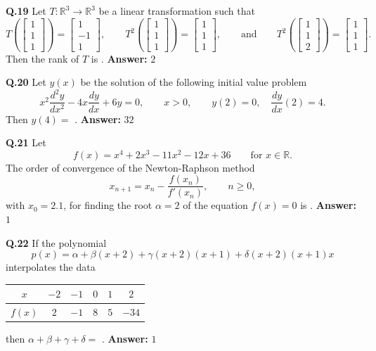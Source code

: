 \documentclass[11pt,a4paper]{article}
\newcommand{\ans}[1]{\textbf{Answer:} #1\par\medskip}
\begin{document}
\textbf{Q.19} Let $T : \mathbb{R}^3 \to \mathbb{R}^3$ be a linear transformation such that
\[
  T\!\left(\begin{bmatrix} 1 \\ 1 \\ 1 \end{bmatrix}\right) = \begin{bmatrix} 1 \\ -1 \\ 1 \end{bmatrix}, \qquad
  T^2\!\left(\begin{bmatrix} 1 \\ 1 \\ 1 \end{bmatrix}\right) = \begin{bmatrix} 1 \\ 1 \\ 1 \end{bmatrix}, \qquad \text{and} \qquad
  T^2\!\left(\begin{bmatrix} 1 \\ 1 \\ 2 \end{bmatrix}\right) = \begin{bmatrix} 1 \\ 1 \\ 1 \end{bmatrix}.
\]
Then the rank of $T$ is \underline{\hspace{2cm}}.
\ans{$2$}

\textbf{Q.20} Let $y(x)$ be the solution of the following initial value problem
\[
  x^2 \frac{d^2 y}{dx^2} - 4x \frac{dy}{dx} + 6y = 0, \qquad x > 0, \qquad y(2) = 0,\quad \frac{dy}{dx}(2) = 4.
\]
Then $y(4) =$ \underline{\hspace{2cm}}.
\ans{$32$}

\textbf{Q.21} Let
\[
  f(x) = x^4 + 2x^3 - 11x^2 - 12x + 36 \qquad \text{for } x \in \mathbb{R}.
\]
The order of convergence of the Newton-Raphson method
\[
  x_{n+1} = x_n - \frac{f(x_n)}{f'(x_n)}, \qquad n \ge 0,
\]
with $x_0 = 2.1$, for finding the root $\alpha = 2$ of the equation $f(x) = 0$ is \underline{\hspace{2cm}}.
\ans{$1$}

\textbf{Q.22} If the polynomial
\[
  p(x) = \alpha + \beta(x + 2) + \gamma(x + 2)(x + 1) + \delta(x + 2)(x + 1)x
\]
interpolates the data
\begin{center}
\begin{tabular}{|c|c|c|c|c|c|}
\hline
$x$ & $-2$ & $-1$ & $0$ & $1$ & $2$ \\
\hline
$f(x)$ & $2$ & $-1$ & $8$ & $5$ & $-34$ \\
\hline
\end{tabular}
\end{center}
then $\alpha + \beta + \gamma + \delta =$ \underline{\hspace{2cm}}.
\ans{$1$}
\end{document}
